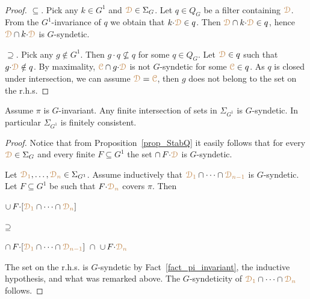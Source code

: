 \begin{proposition}\label{prop_StabQ}\ \smallskip

  \smallskip
\end{proposition}

\begin{proof}
  $\subseteq$.
  Pick any $k\in G^1$ and ${\color{brown}\EuScript D}\in\Sigma_G$.
  Let $q\in Q_G$ be a filter containing ${\color{brown}\EuScript D}$.
  From the $G^1$-invariance of $q$ we obtain that $k{\cdot}{\color{brown}\EuScript D}\in q$.
  Then ${\color{brown}\EuScript D}\cap k{\cdot}{\color{brown}\EuScript D}\in q$, hence ${\color{brown}\EuScript D}\cap k{\cdot}{\color{brown}\EuScript D}$ is $G$-syndetic.

  $\supseteq$.
  Pick any $g\notin G^1$.
  Then $g{\cdot}q\nsubseteq q$ for some $q\in Q_G$.
  Let ${\color{brown}\EuScript D}\in q$ such that $g{\cdot}{\color{brown}\EuScript D}\notin q$.
  By maximality, ${\color{brown}\EuScript C}\cap g{\cdot}{\color{brown}\EuScript D}$ is not $G$-syndetic for some ${\color{brown}\EuScript C}\in q$.
  As $q$ is closed under intersection, we can assume ${\color{brown}\EuScript D}={\color{brown}\EuScript C}$, then $g$ does not belong to the set on the r.h.s.
\end{proof}

\begin{theorem}\label{thm_gammaK}
  Assume $\pi$ is $G$-invariant.
  Any finite intersection of sets in $\Sigma_{G^1}$ is $G$-syndetic.
  In particular $\Sigma_{G^1}$ is finitely consistent.
\end{theorem}

\begin{proof}
  \def\medrel#1{\parbox[t]{5ex}{$\displaystyle\hfil #1$}}
  \def\ceq#1#2#3{\parbox[t]{23ex}{$\displaystyle #1$}\medrel{#2}{$\displaystyle #3$}}
  Notice that from Proposition~\ref{prop_StabQ} it easily follows that for every ${\color{brown}\EuScript D}\in\Sigma_G$ and every finite $F\subseteq G^1$ the set $\cap\,F{\cdot}{\color{brown}\EuScript D}$ is $G$-syndetic.
   
  Let ${\color{brown}\EuScript D_1},\dots,{\color{brown}\EuScript D_n}\in\Sigma_{G^1}$.
  Assume inductively that ${\color{brown}\EuScript D_1}\cap\dots\cap{\color{brown}\EuScript D_{n-1}}$ is $G$-syndetic.
  Let $F\subseteq G^1$ be such that $F{\cdot}{\color{brown}\EuScript D_n}$ covers $\pi$.
  Then
  
  \ceq{\hfill\cup\,F{\cdot}[{\mr\D_1}\cap\dots\cap{\mr\D_n}]}
  {\supseteq}{\cap\, F{\cdot}[{\mr\D_1}\cap\dots\cap{\mr\D_{n-1}}]\ \cap\ \cup\,F{\cdot}{\mr\D_n}}

  The set on the r.h.s. is $G$-syndetic by Fact~\ref{fact_pi_invariant}, the inductive hypothesis, and what was remarked above.
  The $G$-syndeticity of ${\color{brown}\EuScript D_1}\cap\dots\cap{\color{brown}\EuScript D_n}$ follows.
\end{proof}

